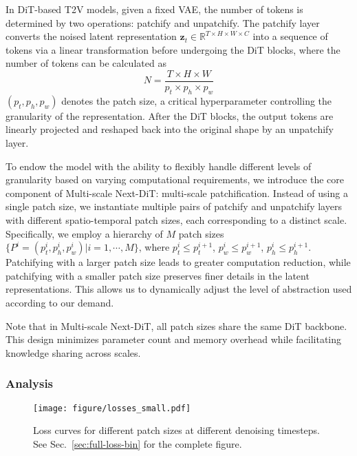 In DiT-based T2V models, given a fixed VAE, the number of tokens is determined by two operations: patchify and unpatchify. 
The patchify layer converts the noised latent representation $\mathbf{z}_t \in \mathbb{R}^{T \times H \times W \times C}$ into a sequence of tokens via a linear transformation before undergoing the DiT blocks, where the number of tokens can be calculated as 
\begin{equation}
    N = \frac{T \times H \times W}{p_t \times p_h \times p_w}
\end{equation}
$(p_t, p_h, p_w)$ denotes the patch size, a critical hyperparameter controlling the granularity of the representation. 
After the DiT blocks, the output tokens are linearly projected and reshaped back into the original shape by an unpatchify layer.

To endow the model with the ability to flexibly handle different levels of granularity based on varying computational requirements, we introduce the core component of Multi-scale Next-DiT: multi-scale patchification. Instead of using a single patch size, we instantiate multiple pairs of patchify and unpatchify layers with different spatio-temporal patch sizes, each corresponding to a distinct scale. Specifically, we employ a hierarchy of $M$ patch sizes
$\{P^i=(p_t^i, p_h^i, p_w^i)|i=1,\cdots,M\}$, where $p_t^i \leq p_t^{i+1}$, $p_w^i \leq p_w^{i+1}$, $p_h^i \leq p_h^{i+1}$. 
Patchifying with a larger patch size 
leads to greater computation reduction, while patchifying with a smaller patch size preserves finer details in the latent representations. This allows us to dynamically adjust the level of abstraction used according to our demand. 

Note that in Multi-scale Next-DiT, all patch sizes share the same DiT backbone. This design minimizes parameter count and memory overhead while facilitating knowledge sharing across scales.

\subsubsection{Analysis}
\label{sec:analysis}

\begin{figure*}[t]
    \centering
    \texttt{[image: figure/losses\_small.pdf]}
    \vspace{-1em}
    \caption{Loss curves for different patch sizes at different denoising timesteps. See Sec.~\ref{sec:full-loss-bin} for the complete figure.}
    \label{fig:loss-bin}
\end{figure*}

